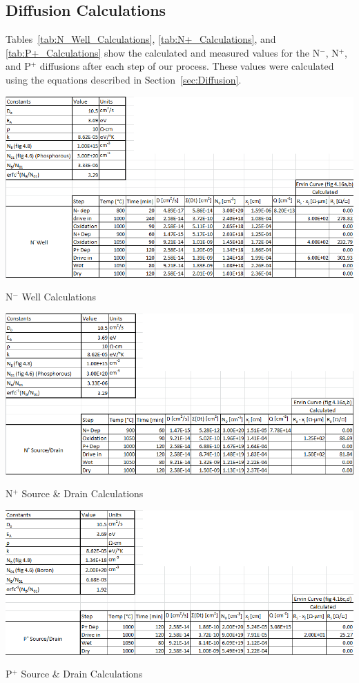 \documentclass[letter,12pt]{article}
\begin{document}
	\FloatBarrier
	\subsection{Diffusion Calculations}
		Tables~\ref{tab:N_Well_Calculations}, \ref{tab:N+_Calculations}, and \ref{tab:P+_Calculations} show the calculated and measured values for the N$^-$, N$^+$, and P$^+$ diffusions after each step of our process.  These values were calculated using the equations described in Section~\ref{sec:Diffusion}. 
		
		\begin{table}[h!]
			\centering
			\includegraphics[width=\textwidth]{./Images/N-_Well_Calculations.png}
			\caption{N$^-$ Well Calculations}
			\label{tab:N_Well_Calculations}
		\end{table}
		
		\begin{table}[h!]
			\centering
			\includegraphics[width=\textwidth]{./Images/N+_Calculations.png}
			\caption{N$^+$ Source \& Drain Calculations}
			\label{tab:N+_Calculations}
		\end{table}
		
		\begin{table}[h!]
			\centering
			\includegraphics[width=\textwidth]{./Images/P+_Calculations.png}
			\caption{P$^+$ Source \& Drain Calculations}
			\label{tab:P+_Calculations}
		\end{table}
	
\end{document}
